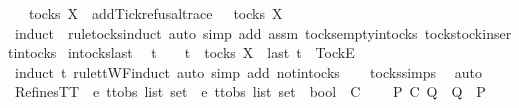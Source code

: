 \begin{isabellebody}
\ {\isachardoublequoteopen}{\isasymrho}\ {\isasymin}\ tocks\ X\ {\isasymLongrightarrow}\ add{\isacharunderscore}Tick{\isacharunderscore}refusal{\isacharunderscore}trace\ {\isasymrho}\ {\isasymin}\ tocks\ X{\isachardoublequoteclose}\isanewline
\ \ \ \ \isamarkupfalse%
\ {\isacharparenleft}induct\ {\isasymrho}\ rule{\isacharcolon}tocks{\isachardot}induct{\isacharcomma}\ auto\ simp\ add{\isacharcolon}\ assm\ tocks{\isachardot}empty{\isacharunderscore}in{\isacharunderscore}tocks\ tocks{\isachardot}tock{\isacharunderscore}insert{\isacharunderscore}in{\isacharunderscore}tocks{\isacharparenright}\isanewline
{}\isamarkupfalse%
%
\endisatagproof
{\isafoldproof}%
%
\isadelimproof
\isanewline
%
\endisadelimproof
\isanewline
{}\isamarkupfalse%
\ in{\isacharunderscore}tocks{\isacharunderscore}last{\isacharcolon}\isanewline
\ \ {\isachardoublequoteopen}t\ {\isasymnoteq}\ {\isacharbrackleft}{\isacharbrackright}\ {\isasymLongrightarrow}\ t\ {\isasymin}\ tocks\ X\ {\isasymLongrightarrow}\ last\ t\ {\isacharequal}\ {\isacharbrackleft}Tock{\isacharbrackright}\isactrlsub E{\isachardoublequoteclose}\isanewline
%
\isadelimproof
\ \ %
\endisadelimproof
%
\isatagproof
{}\isamarkupfalse%
\ {\isacharparenleft}induct\ t\ rule{\isacharcolon}ttWF{\isachardot}induct{\isacharcomma}\ auto\ simp\ add{\isacharcolon}\ notin{\isacharunderscore}tocks{\isacharparenright}\isanewline
\ \ \isamarkupfalse%
\ tocks{\isachardot}simps\ \isamarkupfalse%
\ auto%
\endisatagproof
{\isafoldproof}%
%
\isadelimproof
%
\endisadelimproof
%
\isadelimdocument
%
\endisadelimdocument
%
\isatagdocument
%
\isamarkuptrue%
%
\endisatagdocument
{\isafolddocument}%
%
\isadelimdocument
%
\endisadelimdocument
{}\isamarkupfalse%
\ RefinesTT\ {\isacharcolon}{\isacharcolon}\ {\isachardoublequoteopen}{\isacharprime}e\ ttobs\ list\ set\ {\isasymRightarrow}\ {\isacharprime}e\ ttobs\ list\ set\ {\isasymRightarrow}\ bool{\isachardoublequoteclose}\ {\isacharparenleft}\ {\isachardoublequoteopen}{\isasymsqsubseteq}\isactrlsub C{\isachardoublequoteclose}\ {}{}{\isacharparenright}\ \isanewline
\ \ {\isachardoublequoteopen}P\ {\isasymsqsubseteq}\isactrlsub C\ Q\ {\isacharequal}\ {\isacharparenleft}Q\ {\isasymsubseteq}\ P{\isacharparenright}{\isachardoublequoteclose}%
\isadelimdocument
%
\endisadelimdocument
%
\isatagdocument
%
\isamarkuptrue%
%
\endisatagdocument
{\isafolddocument}%

\end{isabellebody}
